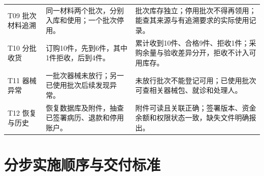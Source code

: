 \documentclass[UTF8,a4paper,zihao=-4,fontset=none]{ctexart}
\begin{document}
{\begin{longtable}{@{}p{2.3cm}p{5.3cm}p{7.9cm}@{}}
\raggedright\arraybackslash T09 批次材料追溯 & \raggedright\arraybackslash 同一材料两个批次，分别入库和使用；一个批次停用。 & \raggedright\arraybackslash 批次库存独立；停用批次不得再领用；能查其来源与有追溯要求的实际使用记录。 \\[4pt]
\raggedright\arraybackslash T10 分批收货 & \raggedright\arraybackslash 订购10件，先到6件，其中1件拒收，后到4件。 & \raggedright\arraybackslash 累计收到10件、合格9件、拒收1件；采购余量与验收差异分开，拒收不计入可用库存。 \\[4pt]
\raggedright\arraybackslash T11 器械异常 & \raggedright\arraybackslash 一批次器械未放行；另一已使用批次后续发现异常。 & \raggedright\arraybackslash 未放行批次不能登记可用；已使用批次可查相关器械包、就诊和处理人。 \\[4pt]
\raggedright\arraybackslash T12 恢复与历史 & \raggedright\arraybackslash 恢复数据库及附件，抽查已签署病历、退款和停用账户。 & \raggedright\arraybackslash 附件可读且关联正确；签署版本、资金余额和权限状态一致，缺失文件明确报出。 \\[4pt]
\bottomrule
\end{longtable}
}
\clearpage\section{分步实施顺序与交付标准}
\end{document}
